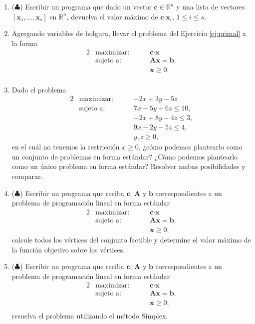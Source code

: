 \documentclass[11pt]{article}
\def \R{\mathbb{R}}
\newcommand{\inner}[2]{#1 \boldsymbol{\cdot} #2}
\newcommand{\bb}{\bm{b}}
\newcommand{\xb}{\bm{x}}
\newcommand{\cb}{\bm{c}}
\newcommand{\Ab}{\bm{A}}
\begin{document}
\begin{enumerate}
\item ($\clubsuit$) Escribir un programa que dado un vector $\cb \in \R^n$ y una lista de vectores $[\xb_1, \dots, \xb_s]$ en $\R^n$, devuelva el valor máximo de $\inner{\cb}{\xb_i}$, $1 \le i \le s$.


\item Agregando variables de holgura, llevar el problema del Ejercicio \ref{ej:primal} a la forma
\begin{alignat*}{2}
  & \text{maximizar: } & \quad & \inner{\cb}{\xb} \\
   & \text{sujeto a: } & & \Ab \xb = \bb, \\
   & & & \xb \ge 0. \\
\end{alignat*}


\item Dado el problema
\begin{alignat*}{2}
  & \text{maximizar: } & \quad & -2x + 3y - 5z \\
   & \text{sujeto a: } & & 7x - 5y + 6z \le 10 , \\
   & & & -2x + 8y - 4z \le 3, \\
   & & & 9x -2y - 5z \le 4, \\
   & & & y, z \ge 0,
\end{alignat*}
en el cuál no tenemos la restricción $x \ge 0$, ¿cómo podemos plantearlo como un conjunto de problemas en forma estándar? ¿Cómo podemos plantearlo como un único problema en forma estándar? Resolver ambas posibilidades y comparar.


\item ($\clubsuit$) Escribir un programa que reciba $\cb$, $\Ab$ y $\bb$ correspondientes a un problema de programación lineal en forma estándar
\begin{alignat*}{2}
  & \text{maximizar: } & \quad & \inner{\cb}{\xb} \\
   & \text{sujeto a: } & & \Ab \xb = \bb, \\
   & & & \xb \ge 0,
\end{alignat*}
calcule todos los vértices del conjunto factible y determine el valor máximo de la función objetivo sobre los vértices.

\item ($\clubsuit$) Escribir un programa que reciba $\cb$, $\Ab$ y $\bb$ correspondientes a un problema de programación lineal en forma estándar
\begin{alignat*}{2}
  & \text{maximizar: } & \quad & \inner{\cb}{\xb} \\
   & \text{sujeto a: } & & \Ab \xb = \bb, \\
   & & & \xb \ge 0, \\
\end{alignat*}
resuelva el problema utilizando el método Simplex.




\end{enumerate}
\end{document}
